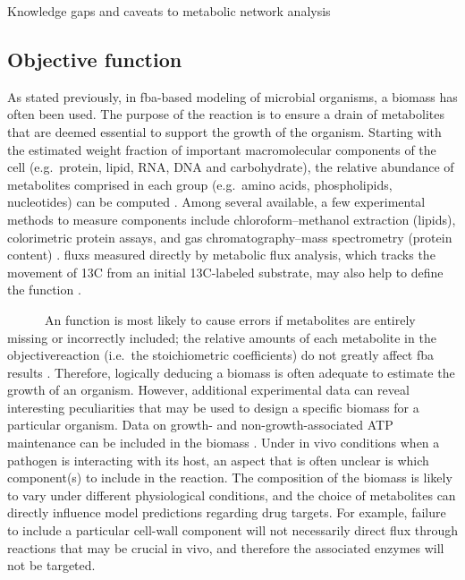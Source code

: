 \begin{pabox}[label=trends:box:caveats,float*=h!,width=\textwidth]{Knowledge gaps and caveats to metabolic network analysis}
\begin{multicols}{2}
\subsection*{Objective function}
As stated previously, in \gls{fba}-based modeling of microbial organisms, 
a \gls{biomass} has often been used. The purpose of 
the reaction is to ensure a drain of metabolites that 
are deemed essential to support the growth of the 
organism. Starting with the estimated weight fraction 
of important macromolecular components of the cell 
(e.g.\ protein, lipid, RNA, DNA and carbohydrate), the 
relative abundance of metabolites comprised in each 
group (e.g.\ amino acids, phospholipids, nucleotides) 
can be computed \cite{Feist:2010hq}. Among several available, a few 
experimental methods to measure  components 
include chloroform–methanol extraction (lipids), 
colorimetric protein assays, and gas chromatography–mass 
spectrometry (protein content) \cite{Boyle:2009jr}. \Glspl{flux} measured 
directly by metabolic flux analysis, which tracks 
the movement of 13C from an initial 13C-labeled 
substrate, may also help to define the  
function \cite{Chen:2011dj,Blank:2005bt}.

~~~~~~An  function is most likely to cause 
errors if metabolites are entirely missing or 
incorrectly included; the relative amounts of each 
metabolite in the \gls{objectivereaction} (i.e.\ the 
stoichiometric coefficients) do not greatly affect 
\gls{fba} results \cite{Varma:1993hd,Varma:1994tb}. Therefore, logically 
deducing a \gls{biomass} is often adequate 
to estimate the growth of an organism. However, 
additional experimental data can reveal interesting 
peculiarities that may be used to design a specific 
\gls{biomass} for a particular organism. 
Data on growth- and non-growth-associated ATP 
maintenance can be included in the \gls{biomass} \cite{Forster:2003jb}. Under in vivo conditions when a 
pathogen is interacting with its host, an aspect 
that is often unclear is which  component(s) 
to include in the reaction. The composition of the 
\gls{biomass} is likely to vary under different 
physiological conditions, and the choice of metabolites 
can directly influence model predictions regarding 
drug targets. For example, failure to include a 
particular cell-wall component will not necessarily 
direct \gls{flux} through reactions that may be crucial in 
vivo, and therefore the associated enzymes will not 
be targeted.
\end{multicols}
\end{pabox}
